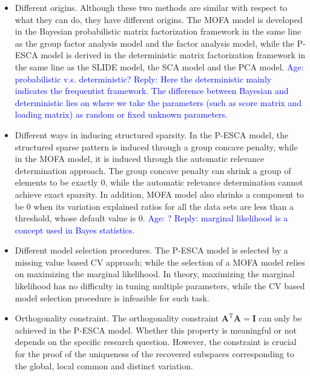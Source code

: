 \begin{itemize}
  \item Different origins. Although these two methods are similar with respect to what they can do, they have different origins. The MOFA model is developed in the Bayesian probabilistic matrix factorization framework in the same line as the group factor analysis model and the factor analysis model, while the P-ESCA model is derived in the deterministic matrix factorization framework in the same line as the SLIDE model, the SCA model and the PCA model. \textcolor{blue}{Age: probabilistic v.s. deterministic? Reply: Here the deterministic mainly indicates the frequentist framework. The difference between Bayesian and deterministic lies on where we take the parameters (such as score matrix and loading matrix) as random or fixed unknown parameters.}
  \item Different ways in inducing structured sparsity. In the P-ESCA model, the structured sparse pattern is induced through a group concave penalty, while in the MOFA model, it is induced through the automatic relevance determination approach. The group concave penalty can shrink a group of elements to be exactly 0, while the automatic relevance determination cannot achieve exact sparsity. In addition, MOFA model also shrinks a component to be 0 when its variation explained ratios for all the data sets are less than a threshold, whose default value is 0. \textcolor{blue}{Age: ? Reply: marginal likelihood is a concept used in Bayes statistics.}
  \item Different model selection procedures. The P-ESCA model is selected by a missing value based CV approach; while the selection of a MOFA model relies on maximizing the marginal likelihood. In theory, maximizing the marginal likelihood has no difficulty in tuning multiple parameters, while the CV based model selection procedure is infeasible for such task.
  \item Orthogonality constraint. The orthogonality constraint $\mathbf{A}^{\text{T}}\mathbf{A} = \mathbf{I}$ can only be achieved in the P-ESCA model. Whether this property is meaningful or not depends on the specific research question. However, the constraint is crucial for the proof of the uniqueness of the recovered subspaces corresponding to the global, local common and distinct variation.
\end{itemize}

